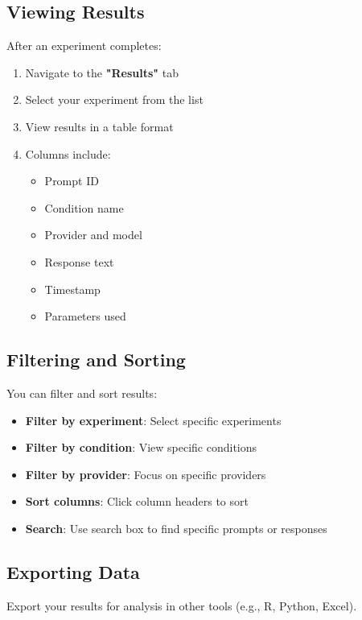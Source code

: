 \documentclass[11pt,a4paper]{article}
\begin{document}
\subsection{Viewing Results}
After an experiment completes:
\begin{enumerate}
    \item Navigate to the \textbf{"Results"} tab
    \item Select your experiment from the list
    \item View results in a table format
    \item Columns include:
    \begin{itemize}
        \item Prompt ID
        \item Condition name
        \item Provider and model
        \item Response text
        \item Timestamp
        \item Parameters used
    \end{itemize}
\end{enumerate}

\subsection{Filtering and Sorting}
You can filter and sort results:
\begin{itemize}
    \item \textbf{Filter by experiment}: Select specific experiments
    \item \textbf{Filter by condition}: View specific conditions
    \item \textbf{Filter by provider}: Focus on specific providers
    \item \textbf{Sort columns}: Click column headers to sort
    \item \textbf{Search}: Use search box to find specific prompts or responses
\end{itemize}

\subsection{Exporting Data}
Export your results for analysis in other tools (e.g., R, Python, Excel).
\end{document}
